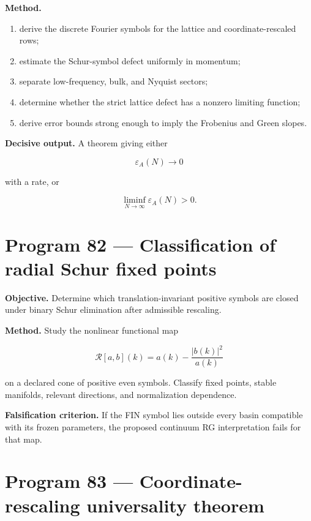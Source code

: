 \documentclass[11pt,a4paper,openany]{report}
\begin{document}
\textbf{Method.}

\begin{enumerate}
\item 
derive the discrete Fourier symbols for the lattice and coordinate-rescaled rows;

\item 
estimate the Schur-symbol defect uniformly in momentum;

\item 
separate low-frequency, bulk, and Nyquist sectors;

\item 
determine whether the strict lattice defect has a nonzero limiting function;

\item 
derive error bounds strong enough to imply the Frobenius and Green slopes.

\end{enumerate}

\textbf{Decisive output.} A theorem giving either

\[
\varepsilon_A(N)\to0
\]

with a rate, or

\[
\liminf_{N\to\infty}\varepsilon_A(N)>0.
\]

\section{Program 82 --- Classification of radial Schur fixed points}

\textbf{Objective.} Determine which translation-invariant positive symbols are closed under binary Schur elimination after admissible rescaling.

\textbf{Method.} Study the nonlinear functional map

\[
\mathcal R[a,b](k)
=
a(k)-\frac{|b(k)|^2}{a(k)}
\]

on a declared cone of positive even symbols. Classify fixed points, stable manifolds, relevant directions, and normalization dependence.

\textbf{Falsification criterion.} If the FIN symbol lies outside every basin compatible with its frozen parameters, the proposed continuum RG interpretation fails for that map.

\section{Program 83 --- Coordinate-rescaling universality theorem}
\end{document}
